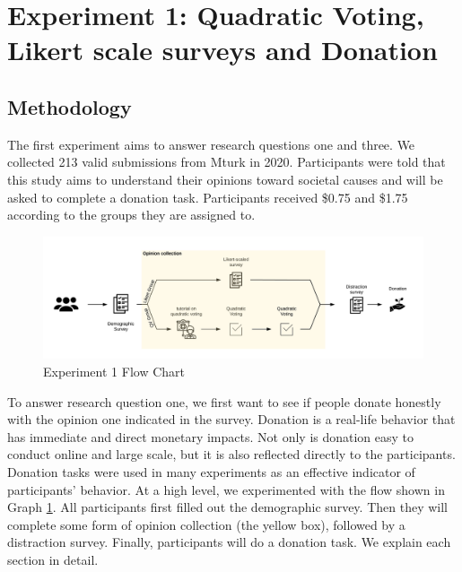 \section{Experiment 1: Quadratic Voting, Likert scale surveys and Donation}
\subsection{Methodology} \label{method-1}
The first experiment aims to answer research questions one and three. 
We collected 213 valid submissions from Mturk in 2020. %
Participants were told that this study aims to understand their opinions toward societal causes and will be asked to complete a donation task.
Participants received \$0.75 and \$1.75 according to the groups they are assigned to.

\begin{figure}[htpb]
    \centering
    \includegraphics[width=\textwidth, keepaspectratio=true]{content/image/exp1_flow.png}
    \caption{
        Experiment 1 Flow Chart
    }
    \label{fig:exp1_image_flow}
\end{figure}

To answer research question one, we first want to see if people donate honestly with the opinion one indicated in the survey.
Donation is a real-life behavior that has immediate and direct monetary impacts.
Not only is donation easy to conduct online and large scale, but it is also reflected directly to the participants.
Donation tasks were used in many experiments \cite{Xiao2019, benz2008people, gendall2010effect} as an effective indicator of participants' behavior.
At a high level, we experimented with the flow shown in Graph \ref{fig:exp1_image_flow}.
All participants first filled out the demographic survey.
Then they will complete some form of opinion collection (the yellow box), followed by a distraction survey.
Finally, participants will do a donation task.
We explain each section in detail.

